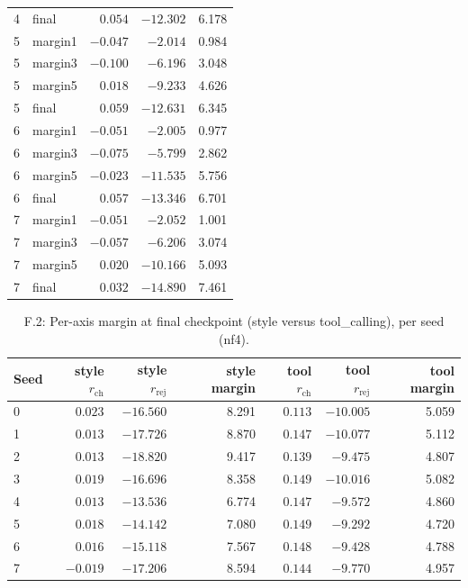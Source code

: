 \begin{table}[H]
\begin{tabular}{@{}llrrr@{}}
4 & final & $0.054$ & $-12.302$ & 6.178\\
5 & margin1 & $-0.047$ & $-2.014$ & 0.984\\
5 & margin3 & $-0.100$ & $-6.196$ & 3.048\\
5 & margin5 & $0.018$ & $-9.233$ & 4.626\\
5 & final & $0.059$ & $-12.631$ & 6.345\\
6 & margin1 & $-0.051$ & $-2.005$ & 0.977\\
6 & margin3 & $-0.075$ & $-5.799$ & 2.862\\
6 & margin5 & $-0.023$ & $-11.535$ & 5.756\\
6 & final & $0.057$ & $-13.346$ & 6.701\\
7 & margin1 & $-0.051$ & $-2.052$ & 1.001\\
7 & margin3 & $-0.057$ & $-6.206$ & 3.074\\
7 & margin5 & $0.020$ & $-10.166$ & 5.093\\
7 & final & $0.032$ & $-14.890$ & 7.461\\
\bottomrule
\end{tabular}
\end{table}

\begin{table}[H]
\centering
\small
\caption{F.2: Per-axis margin at final checkpoint (style versus tool\_calling), per seed (nf4).}
\label{tab:peraxis-perseed}
\begin{tabular}{@{}lrrrrrr@{}}
\toprule
Seed & style $r_{\text{ch}}$ & style $r_{\text{rej}}$ & style margin & tool $r_{\text{ch}}$ & tool $r_{\text{rej}}$ & tool margin\\
\midrule
0 & $0.023$ & $-16.560$ & 8.291 & $0.113$ & $-10.005$ & 5.059\\
1 & $0.013$ & $-17.726$ & 8.870 & $0.147$ & $-10.077$ & 5.112\\
2 & $0.013$ & $-18.820$ & 9.417 & $0.139$ & $-9.475$ & 4.807\\
3 & $0.019$ & $-16.696$ & 8.358 & $0.149$ & $-10.016$ & 5.082\\
4 & $0.013$ & $-13.536$ & 6.774 & $0.147$ & $-9.572$ & 4.860\\
5 & $0.018$ & $-14.142$ & 7.080 & $0.149$ & $-9.292$ & 4.720\\
6 & $0.016$ & $-15.118$ & 7.567 & $0.148$ & $-9.428$ & 4.788\\
7 & $-0.019$ & $-17.206$ & 8.594 & $0.144$ & $-9.770$ & 4.957\\
\bottomrule
\end{tabular}
\end{table}

